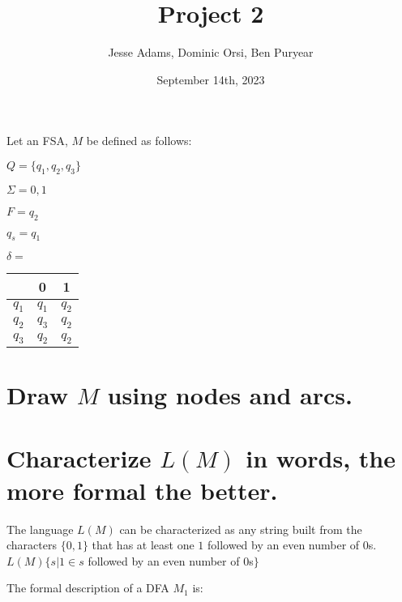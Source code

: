 \documentclass{article}
\title{Project 2}
\author{Jesse Adams, Dominic Orsi, Ben Puryear}
\date{September 14th, 2023}
\begin{document}
\maketitle

Let an FSA, $M$ be defined as follows:

$Q = \{q_1, q_2, q_3\}$

$\Sigma = {0,1}$

$F = {q_2}$

$q_s = q_1$


$\delta = $
\begin{tabular}{ |c|c|c| }
	& 0     & 1     \\
	\hline
	$q_1$ & $q_1$ & $q_2$ \\
	$q_2$ & $q_3$ & $q_2$ \\
	$q_3$ & $q_2$ & $q_2$ \\
\end{tabular}


\section{Draw $M$ using nodes and arcs.}

\section{Characterize $L(M)$ in words, the more formal the better.}

The language $L(M)$ can be characterized as any string built from the characters $\{0, 1\}$ that has at least one $1$ followed by an even number of $0$s. \\
$L(M)\{s|1 \in s$ followed by an even number of $0$s$\}$
\newpage

The formal description of a DFA $M_1$ is:
\end{document}
